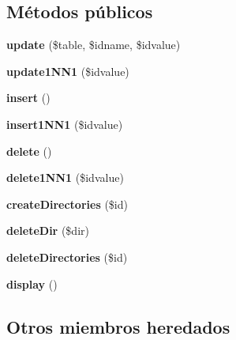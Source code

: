\subsection*{Métodos públicos}
\begin{DoxyCompactItemize}
\item 
\mbox{\label{classdatabasemanager_a23e8b4bd50cb6cae2007eb148f5e99ab}} 
{\bfseries update} (\$table, \$idname, \$idvalue)
\item 
\mbox{\label{classdatabasemanager_adb5e50ea96be1714588592eb5024f0b3}} 
{\bfseries update1\+N\+N1} (\$idvalue)
\item 
\mbox{\label{classdatabasemanager_ac215ce5b47d2f5bfa36621fe45b3eedf}} 
{\bfseries insert} ()
\item 
\mbox{\label{classdatabasemanager_a09e06d8512461851688d5a34d5a31c1d}} 
{\bfseries insert1\+N\+N1} (\$idvalue)
\item 
\mbox{\label{classdatabasemanager_a86356dce647d0d5c74ff78276844f8ca}} 
{\bfseries delete} ()
\item 
\mbox{\label{classdatabasemanager_ac40bb924bbe6dff5aba9f0c1636a2fdd}} 
{\bfseries delete1\+N\+N1} (\$idvalue)
\item 
\mbox{\label{classdatabasemanager_ad3462cf95718f57f3c7cc634c9d3a829}} 
{\bfseries create\+Directories} (\$id)
\item 
\mbox{\label{classdatabasemanager_a183c2e82b2a4d6429fea64565a723a47}} 
{\bfseries delete\+Dir} (\$dir)
\item 
\mbox{\label{classdatabasemanager_a4f77b12a19b44a980cf33c833ce27b21}} 
{\bfseries delete\+Directories} (\$id)
\item 
\mbox{\label{classdatabasemanager_a321eb1187e03a72d03509388b3daddec}} 
{\bfseries display} ()
\end{DoxyCompactItemize}
\subsection*{Otros miembros heredados}


